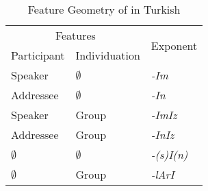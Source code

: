 \begin{table}[hbt!]
    \caption{Feature Geometry of {\Poss} in Turkish}
    \centering
    \begin{tabular}{|l|l|l|}
    \hline
         \multicolumn{2}{|c|}{Features} & \multirow{2}{*}{Exponent}  \\ \cline{1-2}
         Participant & Individuation  & \\ \hline
         Speaker & $\emptyset$ & \textit{-Im} \\ \hline 
         Addressee & $\emptyset$ & \textit{-In} \\ \hline 
         Speaker & Group & \textit{-ImIz} \\ \hline 
         Addressee & Group & \textit{-InIz} \\ \hline 
         $\emptyset$ & $\emptyset$ & \textit{-(s)I(n)} \\ \hline 
         $\emptyset$ & Group & \textit{-lArI} \\ \hline 
    \end{tabular}
    \label{tab:kharyfeatures}
\end{table}